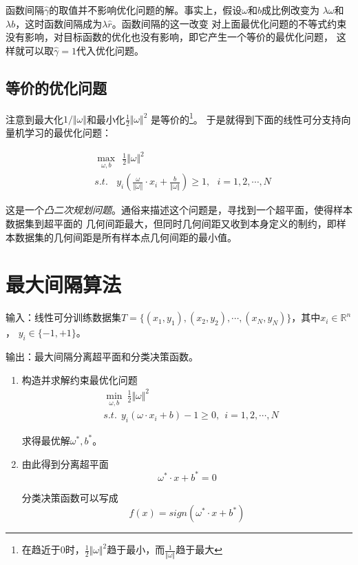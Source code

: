 函数间隔$\hat{\gamma}$的取值并不影响优化问题的解。事实上，假设$\omega$和$b$成比例改变为
$\lambda\omega$和$\lambda b$，这时函数间隔成为$\lambda \hat{r}$。函数间隔的这一改变
对上面最优化问题的不等式约束没有影响，对目标函数的优化也没有影响，即它产生一个等价的最优化问题，
这样就可以取$\hat{\gamma}=1$代入优化问题。

\subsection*{等价的优化问题}
注意到最大化$1/\Vert\omega\Vert$和最小化$\frac{1}{2}\Vert\omega\Vert^2$
是等价的\footnote{在趋近于$0$时，$\frac{1}{2}\Vert\omega\Vert^2$趋于最小，而$\frac{1}{\Vert\omega\Vert}$趋于最大}。
于是就得到下面的线性可分支持向量机学习的最优化问题：
\begin{framed}
\begin{equation}
    \begin{aligned}
    &\max\limits_{\omega,b}\ \ \frac{1}{2}\Vert\omega\Vert^2\\
    &s.t.\ \ \ \ y_i(\frac{\omega}{\Vert \omega\Vert}\cdot x_i+\frac{b}{
        \Vert \omega\Vert})\geqslant 1,\ \ \ i=1,2,\cdots,N
\end{aligned}
\end{equation}
\end{framed}

这是一个\textsl{凸二次规划问题}。通俗来描述这个问题是，寻找到一个超平面，使得样本数据集到超平面的
几何间距最大，但同时几何间距又收到本身定义的制约，即样本数据集的几何间距是所有样本点几何间距的最小值。

\section{最大间隔算法}
输入：线性可分训练数据集$T=\{(x_1,y_1),(x_2,y_2),\cdots,(x_N,y_N)\}$，其中$x_i\in \mathbb{R}^n$，
$y_i\in \{-1,+1\}$。

输出：最大间隔分离超平面和分类决策函数。

\begin{enumerate}[itemindent=2em]
    \item 构造并求解约束最优化问题
    \begin{equation}
        \begin{aligned}
            & \min\limits_{\omega,b}\ \frac{1}{2}\Vert \omega\Vert^2\\
            & s.t. \ \ y_i(\omega\cdot x_i+b)-1\geqslant 0,\ \ i=1,2,\cdots,N
        \end{aligned}
    \end{equation}

    求得最优解$\omega^*,b^*$。
    \item 由此得到分离超平面
    \begin{equation}
        \omega^*\cdot x+b^*=0
    \end{equation}

    分类决策函数可以写成
    \begin{equation}
        f(x)=sign(\omega^*\cdot x+b^*)
    \end{equation}
\end{enumerate}

